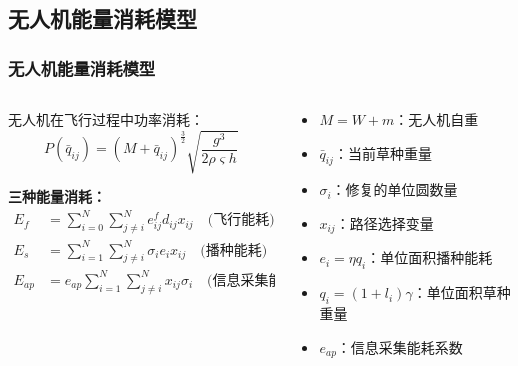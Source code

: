 \documentclass[10pt, aspectratio=169]{beamer}  %
\begin{document}
\subsection{无人机能量消耗模型}
\begin{frame}
	\frametitle{无人机能量消耗模型}
	\begin{columns}
		\begin{column}{0.55\textwidth}
			无人机在飞行过程中功率消耗：
			\begin{equation*}
				P(\bar{q}_{ij}) = (M + \bar{q}_{ij})^{\frac{3}{2}}\sqrt{\frac{g^3}{2 \rho \varsigma h}}
			\end{equation*}

			\textbf{三种能量消耗：}
			\begin{align*}
				E_f    & = \sum^N_{i=0}\sum^N_{j \neq i} e^f_{ij} d_{ij} x_{ij} \quad \text{(飞行能耗)} \\
				E_s    & = \sum^N_{i = 1}\sum^N_{j \neq i}\sigma_i e_i x_{ij} \quad \text{(播种能耗)}   \\
				E_{ap} & = e_{ap}\sum^N_{i=1}\sum^N_{j \neq i} x_{ij}\sigma_i \quad \text{(信息采集能耗)}
			\end{align*}
		\end{column}
		\begin{column}{0.45\textwidth}
			\begin{itemize}
				\item $M = W + m$：无人机自重
				\item $\bar{q}_{ij}$：当前草种重量
				\item $\sigma_i$：修复的单位圆数量
				\item $x_{ij}$：路径选择变量
				\item $e_i = \eta q_i$：单位面积播种能耗
				\item $q_i = (1 + l_i) \gamma$：单位面积草种重量
				\item $e_{ap}$：信息采集能耗系数
			\end{itemize}
		\end{column}
	\end{columns}
\end{frame}
\end{document}
